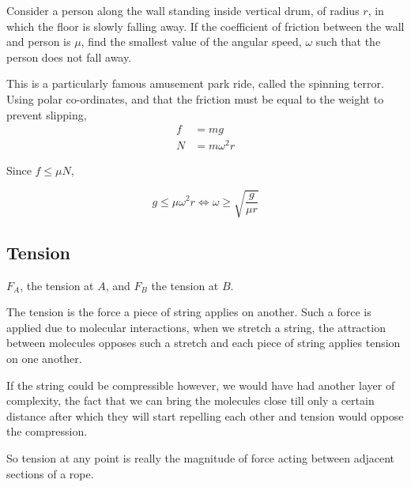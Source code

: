 \begin{example}
    Consider a person along the wall standing inside vertical drum, of radius \(r\), in which the floor is slowly falling 
    away. If the coefficient of friction between the wall and person is \(\mu\), find 
    the smallest value of the angular speed, \(\omega\) such that the person does not fall away.

    \begin{soln}
        This is a particularly famous amusement park ride, called the spinning terror. Using
        polar co-ordinates, and that the friction must be equal to the weight to prevent slipping,
        \begin{align*}
            f &= mg \\
            N &= m\omega^2r
        \end{align*}
        
        Since \(f \le \mu N\),

        \begin{equation*}
            g \le \mu \omega^2 r \iff \omega \ge \sqrt{\frac{g}{\mu r}}
        \end{equation*}
        
    \end{soln}
\end{example}

\subsection{Tension}

\begin{marginfigure}
    \caption{\(F_A\), the tension at \(A\), and \(F_B\) the tension at \(B\).}
\end{marginfigure}

The tension is the force a piece of string applies on another. Such a force 
is applied due to molecular interactions, when we stretch a string, the attraction 
between molecules opposes such a stretch and each piece of string applies tension on one another.

If the string could be compressible however, we would have had another layer of complexity,
the fact that we can bring the molecules close till only a certain distance after which 
they will start repelling each other and tension would oppose the compression.

So tension at any point is really the magnitude of force acting between adjacent sections of a rope.

